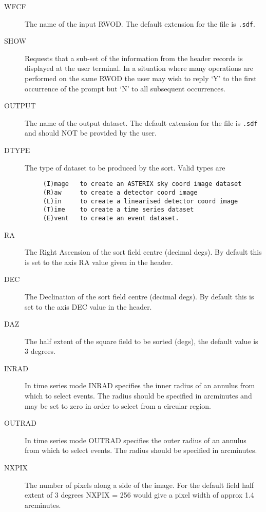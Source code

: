 \begin{description}

\item[WFCF]
The name of the input RWOD.  The default extension for the file is {\tt .sdf}.

\item[SHOW]
Requests that a sub-set of the information from the header records
is displayed at the user terminal. In a situation where many
operations are performed on the same RWOD the user may wish to reply
`Y' to the first occurrence of the prompt but `N' to all subsequent
occurrences.

\item[OUTPUT]
The name of the output dataset. The default extension for the file is
{\tt .sdf} and should NOT be provided by the user.

\item[DTYPE]
The type of dataset to be produced by the sort. Valid types are

\begin{verbatim}
     (I)mage   to create an ASTERIX sky coord image dataset
     (R)aw     to create a detector coord image
     (L)in     to create a linearised detector coord image
     (T)ime    to create a time series dataset
     (E)vent   to create an event dataset.
\end{verbatim}

\item[RA]
The Right Ascension of the sort field centre (decimal degs). By default this
is set to the axis RA value  given in the header.

\item[DEC]
The Declination of the sort field centre (decimal degs). By default this
is set to the axis DEC value in the header.

\item[DAZ]
The half extent of the square field to be sorted (degs),
the default value is 3 degrees.

\item[INRAD]
In time series mode INRAD specifies the inner radius of an annulus
from which to select events. The radius should be specified in arcminutes
and may be set to zero in order to select from a circular region.

\item[OUTRAD]
In time series mode OUTRAD specifies the outer radius of an annulus
from which to select events. The radius should be specified in arcminutes.

\item[NXPIX]
The number of pixels along a side of the image. For the default field
half extent of 3 degrees NXPIX = 256 would give a pixel width of approx
1.4 arcminutes.


\end{description}
